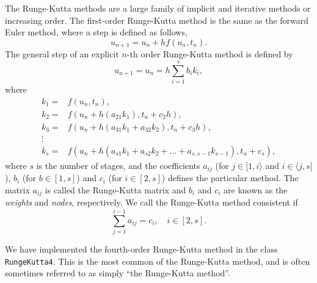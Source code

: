     The Runge-Kutta methods are a large family of implicit and iterative methods or 
    increasing order. The first-order Runge-Kutta method is the same as the forward 
    Euler method, where a step is defined as follows, 
    \begin{equation}
        u_{n+1} = u_n + h f(u_n, t_n).
    \end{equation}
    The general step of an explicit $n$-th order Runge-Kutta method is defined
    by
    \begin{equation}
        u_{n+1} = u_n = h \sum_{i=1}^s b_i k_i,
    \end{equation}
    where 
    \begin{equation}
        \begin{aligned}
            k_1 =& f(u_n, t_n), \\
            k_2 =& f(u_n + h(a_{21}k_1), t_n + c_2h), \\
            k_3 =& f(u_n + h(a_{31}k_1 + a_{32}k_2), t_n + c_3h), \\
                \vdots& \\
            k_s =& f(u_n + h(a_{s1}k_1 + a_{s2}k_2 + \dots + a_{s,s-1}k_{s-1}), t_n + c_s),
        \end{aligned}
    \end{equation}
    where $s$ is the number of stages, and the coefficients $a_{ij}$ 
    (for $j\in[1,i\rangle$ and $i\in\langle j, s]$), $b_i$ (for $b\in[1,s]$)
    and $c_i$ (for $i\in[2,s]$) defines the particular method. The matrix 
    $a_{ij}$ is called the Runge-Kutta matrix and $b_i$ and $c_i$ are known as the 
    \emph{weights} and \emph{nodes}, respectively. We call the Runge-Kutta method consistent 
    if
    \begin{equation*}
        \sum_{j=1}^{i-1} a_{ij} = c_i, \quad i \in[2,s].
    \end{equation*}

    We have implemented the fourth-order Runge-Kutta method in the class
    \lstinline{RungeKutta4}. This is the most common of the Runge-Kutta method, and is 
    often sometimes referred to as simply ``the Runge-Kutta method''. 

    

